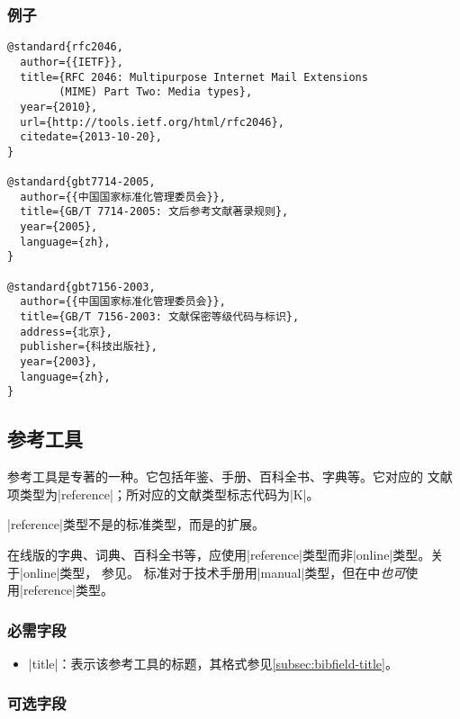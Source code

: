 \subsubsection{例子}

\begin{verbatim}
@standard{rfc2046,
  author={{IETF}},
  title={RFC 2046: Multipurpose Internet Mail Extensions 
        (MIME) Part Two: Media types},
  year={2010},
  url={http://tools.ietf.org/html/rfc2046},
  citedate={2013-10-20},
}

@standard{gbt7714-2005,
  author={{中国国家标准化管理委员会}},
  title={GB/T 7714-2005: 文后参考文献著录规则},
  year={2005},
  language={zh},
}

@standard{gbt7156-2003,
  author={{中国国家标准化管理委员会}},
  title={GB/T 7156-2003: 文献保密等级代码与标识},
  address={北京},
  publisher={科技出版社},
  year={2003},
  language={zh},
}
\end{verbatim}


\subsection{参考工具}\label{subsec:bibtype-reference}

参考工具是专著的一种。它包括年鉴、手册、百科全书、字典等\cite{gbt3469-1983}。它对应的
{\BibTeX}文献项类型为|reference|；所对应的文献类型标志代码为|K|\cite{gbt3469-1983}。

|reference|类型不是{\BibTeX}的标准类型，而是{\njuthesis}的扩展。

\begin{note}
在线版的字典、词典、百科全书等，应使用|reference|类型而非|online|类型。关于|online|类型，
参见\cite{subsec:bibtype-online}。
标准{\BibTeX}对于技术手册用|manual|类型，但在{\njuthesis}中\emph{也可}使
用|reference|类型。
\end{note}

\subsubsection{必需字段}

\begin{itemize}
\item |title|：表示该参考工具的标题，其格式参见\ref{subsec:bibfield-title}。
\end{itemize}

\subsubsection{可选字段}

